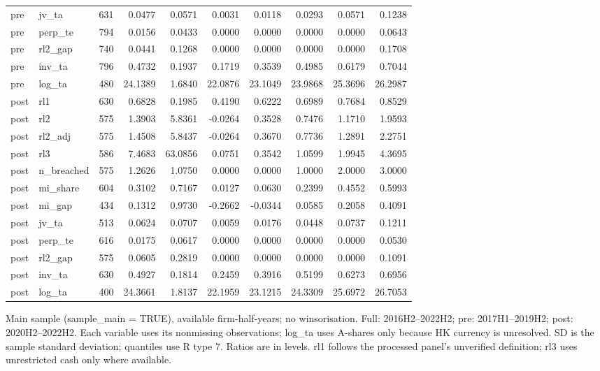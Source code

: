 \begin{threeparttable}
\begin{tabular}{llrrrrrrrr}
pre & jv\_ta & 631 & 0.0477 & 0.0571 & 0.0031 & 0.0118 & 0.0293 & 0.0571 & 0.1238 \\
pre & perp\_te & 794 & 0.0156 & 0.0433 & 0.0000 & 0.0000 & 0.0000 & 0.0000 & 0.0643 \\
pre & rl2\_gap & 740 & 0.0441 & 0.1268 & 0.0000 & 0.0000 & 0.0000 & 0.0000 & 0.1708 \\
pre & inv\_ta & 796 & 0.4732 & 0.1937 & 0.1719 & 0.3539 & 0.4985 & 0.6179 & 0.7044 \\
pre & log\_ta & 480 & 24.1389 & 1.6840 & 22.0876 & 23.1049 & 23.9868 & 25.3696 & 26.2987 \\
post & rl1 & 630 & 0.6828 & 0.1985 & 0.4190 & 0.6222 & 0.6989 & 0.7684 & 0.8529 \\
post & rl2 & 575 & 1.3903 & 5.8361 & -0.0264 & 0.3528 & 0.7476 & 1.1710 & 1.9593 \\
post & rl2\_adj & 575 & 1.4508 & 5.8437 & -0.0264 & 0.3670 & 0.7736 & 1.2891 & 2.2751 \\
post & rl3 & 586 & 7.4683 & 63.0856 & 0.0751 & 0.3542 & 1.0599 & 1.9945 & 4.3695 \\
post & n\_breached & 575 & 1.2626 & 1.0750 & 0.0000 & 0.0000 & 1.0000 & 2.0000 & 3.0000 \\
post & mi\_share & 604 & 0.3102 & 0.7167 & 0.0127 & 0.0630 & 0.2399 & 0.4552 & 0.5993 \\
post & mi\_gap & 434 & 0.1312 & 0.9730 & -0.2662 & -0.0344 & 0.0585 & 0.2058 & 0.4091 \\
post & jv\_ta & 513 & 0.0624 & 0.0707 & 0.0059 & 0.0176 & 0.0448 & 0.0737 & 0.1211 \\
post & perp\_te & 616 & 0.0175 & 0.0617 & 0.0000 & 0.0000 & 0.0000 & 0.0000 & 0.0530 \\
post & rl2\_gap & 575 & 0.0605 & 0.2819 & 0.0000 & 0.0000 & 0.0000 & 0.0000 & 0.1091 \\
post & inv\_ta & 630 & 0.4927 & 0.1814 & 0.2459 & 0.3916 & 0.5199 & 0.6273 & 0.6956 \\
post & log\_ta & 400 & 24.3661 & 1.8137 & 22.1959 & 23.1215 & 24.3309 & 25.6972 & 26.7053 \\
\bottomrule
\end{tabular}
\begin{tablenotes}[flushleft]
\footnotesize
\item Main sample (sample\_main = TRUE), available firm-half-years; no winsorisation. Full: 2016H2--2022H2; pre: 2017H1--2019H2; post: 2020H2--2022H2. Each variable uses its nonmissing observations; log\_ta uses A-shares only because HK currency is unresolved. SD is the sample standard deviation; quantiles use R type 7. Ratios are in levels. rl1 follows the processed panel's unverified definition; rl3 uses unrestricted cash only where available.
\end{tablenotes}
\end{threeparttable}
